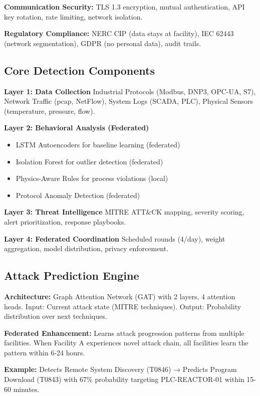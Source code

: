 \documentclass[12pt,a4paper]{article}
\begin{document}
\textbf{Communication Security:}
TLS 1.3 encryption, mutual authentication, API key rotation, rate limiting, network isolation.

\textbf{Regulatory Compliance:}
NERC CIP (data stays at facility), IEC 62443 (network segmentation), GDPR (no personal data), audit trails.

\subsection{Core Detection Components}

\textbf{Layer 1: Data Collection}
Industrial Protocols (Modbus, DNP3, OPC-UA, S7), Network Traffic (pcap, NetFlow), System Logs (SCADA, PLC), Physical Sensors (temperature, pressure, flow).

\textbf{Layer 2: Behavioral Analysis (Federated)}
\begin{itemize}[leftmargin=1cm,itemsep=0pt]
    \item LSTM Autoencoders for baseline learning (federated)
    \item Isolation Forest for outlier detection (federated)
    \item Physics-Aware Rules for process violations (local)
    \item Protocol Anomaly Detection (federated)
\end{itemize}

\textbf{Layer 3: Threat Intelligence}
MITRE ATT\&CK mapping, severity scoring, alert prioritization, response playbooks.

\textbf{Layer 4: Federated Coordination}
Scheduled rounds (4/day), weight aggregation, model distribution, privacy enforcement.

\subsection{Attack Prediction Engine}
\textbf{Architecture:} Graph Attention Network (GAT) with 2 layers, 4 attention heads. Input: Current attack state (MITRE techniques). Output: Probability distribution over next techniques.

\textbf{Federated Enhancement:} Learns attack progression patterns from multiple facilities. When Facility A experiences novel attack chain, all facilities learn the pattern within 6-24 hours.

\textbf{Example:} Detects Remote System Discovery (T0846) → Predicts Program Download (T0843) with 67\% probability targeting PLC-REACTOR-01 within 15-60 minutes.
\end{document}
